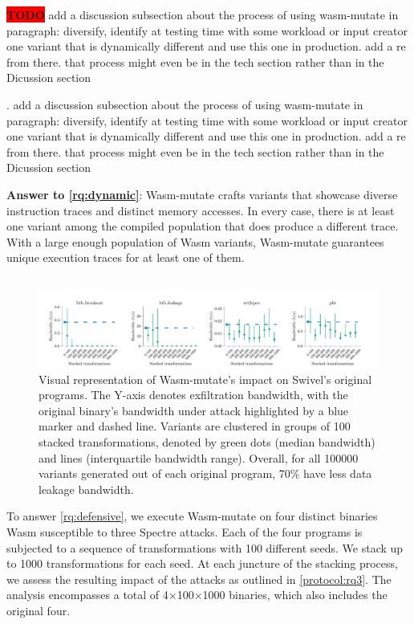 \documentclass[sigplan,screen]{acmart}
\newcommand*\badge[1]{ \colorbox{red}{\color{white}#1}}
\newcommand{\tool}{Wasm-mutate\xspace}
\newcommand{\wasm}{Wasm\xspace}
\newcommand{\todo}[1]{%
\refstepcounter{todo}
\noindent\textbf{\badge{TODO}} {\color{red}#1}
\addcontentsline{td}{todo}
{\color{red}\thesection.\thetodo\xspace #1}}
\begin{document}
\todo{add a discussion subsection about the process of using wasm-mutate in paragraph: diversify, identify at testing time with some workload or input creator one variant that is dynamically different and use this one in production. add a re from there. that process might even be in the tech section rather than in the Dicussion section}

\begin{tcolorbox}[boxrule=1pt,arc=.3em,boxsep=-1.3mm]
  \textbf{Answer to \ref{rq:dynamic}}:   \tool crafts variants that showcase diverse instruction traces and distinct memory accesses. 
  In every case, there is at least one variant among the compiled population that does produce a different trace. 
  With a large enough population of \wasm variants, \tool guarantees unique execution traces for at least one of them. 
\end{tcolorbox}


\subsection{\rqdefensive}



\begin{figure}
    \centering
    \includegraphics[width=\linewidth]{plots/rq3/results.rq3.pdf}
    \caption{Visual representation of \tool's impact on Swivel's original programs. The Y-axis denotes exfiltration bandwidth, with the original binary's bandwidth under attack highlighted by a blue marker and dashed line. Variants are clustered in groups of 100 stacked transformations, denoted by green dots (median bandwidth) and lines (interquartile bandwidth range). Overall, for all 100000 variants generated out of each original program, 70\% have less data leakage bandwidth.}
  \label{attacks:impact}
\end{figure}

To answer \ref{rq:defensive}, we execute \tool on four distinct binaries \wasm susceptible to three Spectre attacks. Each of the four programs is subjected to a sequence of transformations with 100 different seeds. 
We stack up to 1000 transformations for each seed. 
At each juncture of the stacking process, we assess the resulting impact of the attacks as outlined in \ref{protocol:rq3}. 
The  analysis encompasses a total of 4$\times$100$\times$1000 binaries, which also includes the original four.
\end{document}
